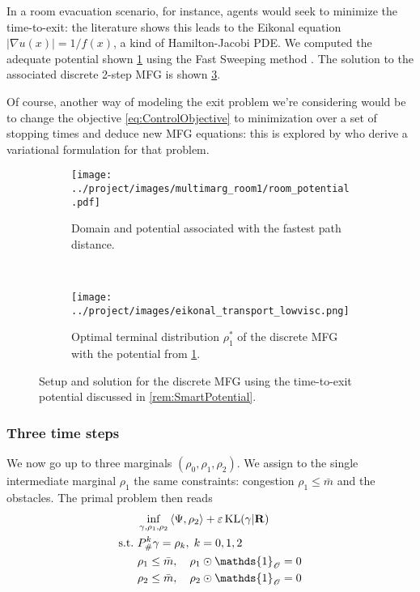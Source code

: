 \documentclass[../report.tex]{subfiles}
\begin{document}
\begin{remark}\label{rem:SmartPotential}
In a room evacuation scenario, for instance, agents would seek to minimize the time-to-exit: the literature shows this leads to the Eikonal equation $|\nabla u(x)| = 1/f(x)$, a kind of Hamilton-Jacobi PDE. We computed the adequate potential shown \cref{fig:CrowdShortedPathPotential} using the Fast Sweeping method \parencite{Zhao2004AFS}. The solution to the associated discrete 2-step MFG is shown \cref{fig:2MargEikonalGame}.
\end{remark}

Of course, another way of modeling the exit problem we're considering would be to change the objective \eqref{eq:ControlObjective} to minimization over a set of stopping times and deduce new MFG equations: this is explored by \textcite{benamou:hal-01295299} who derive a variational formulation for that problem.


\begin{figure}
	\centering
	\begin{subfigure}[b]{.45\linewidth}
		\centering
		\texttt{[image: ../project/images/multimarg\_room1/room\_potential.pdf]}
		\caption{Domain and potential associated with the fastest path distance.}\label{fig:CrowdShortedPathPotential}
	\end{subfigure}~
	\begin{subfigure}[b]{.4\linewidth}
		\centering
		\texttt{[image: ../project/images/eikonal\_transport\_lowvisc.png]}
		\caption{Optimal terminal distribution $\rho^*_1$ of the discrete MFG with the potential from \cref{fig:CrowdShortedPathPotential}.}\label{fig:2MargEikonalGame}
	\end{subfigure}
	\caption{Setup and solution for the discrete MFG using the time-to-exit potential discussed in \cref{rem:SmartPotential}.}
\end{figure}


\subsubsection{Three time steps}

We now go up to three marginals $(\rho_0,\rho_1,\rho_2)$. We assign to the single intermediate marginal $\rho_1$ the same constraints: congestion $\rho_1 \leq \bar{m}$ and the obstacles. The primal problem then reads
\begin{equation}
\begin{aligned}
	&\inf_{\gamma,\rho_1,\rho_2}{} \langle \Psi, \rho_2\rangle + \epsilon \KL(\gamma | \bfR) \\
	\suchthat \ & P^k_\#\gamma = \rho_k,\; k = 0,1,2 \\
	& \rho_1 \leq \bar{m}, \quad \rho_1\odot\mathds{1}_{\mathscr O} = 0\\
	& \rho_2 \leq \bar{m}, \quad \rho_2\odot\mathds{1}_{\mathscr O} = 0
\end{aligned}
\end{equation}
\end{document}
